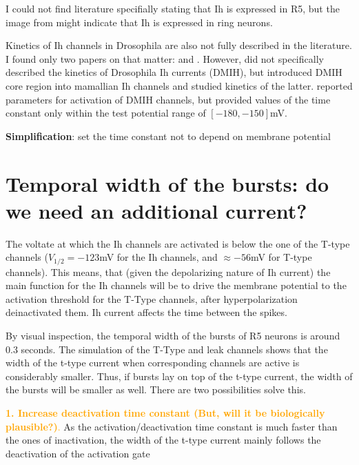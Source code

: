 \documentclass[11pt]{article}
\begin{document}
I could not find literature specifially stating that Ih is expressed in R5,
but the image from \parencite{gonzalo-gomezIhCurrentNecessary2012} might indicate that
Ih is expressed in ring neurons.

Kinetics of Ih channels in Drosophila are also not fully described in the literature. I found
only two papers on that matter: \parencite{gisselmannVariantsDrosophilaMelanogaster2005} and
\parencite{ishiiPeripheralCterminalDomains2007}. However, \parencite{ishiiPeripheralCterminalDomains2007}
did not specifically described the kinetics of Drosophila Ih currents (DMIH), but introduced DMIH
core region into mamallian Ih channels and studied kinetics of the latter. \parencite{gisselmannVariantsDrosophilaMelanogaster2005}
reported parameters for activation of DMIH channels, but provided values of the time constant
only within the test potential range of $[-180, -150]$mV.

\textbf{Simplification}: set the time constant not to depend on membrane potential


\section{Temporal width of the bursts: do we need an additional current?}
    
The voltate at which the Ih channels are activated is below the one of the
T-type channels ($V_{1/2}=-123$mV for the Ih channels, and $\approx-56$mV for T-type
channels). This means, that (given the depolarizing nature of Ih current)
the main function for the Ih channels will be to drive the
membrane potential to the activation threshold for the T-Type channels, after
hyperpolarization deinactivated them. Ih current affects the time between the spikes.

By visual inspection, the temporal width of the bursts of R5 neurons is around
0.3 seconds. The simulation of the T-Type and leak channels shows that the width of the
t-type current when corresponding channels are active is considerably smaller. Thus,
if bursts lay on top of the t-type current, the width of the bursts will be smaller
as well. There are two possibilities solve this.

\textcolor{orange}{
    \textbf{1. Increase deactivation time constant (But, will it be biologically plausible?)}.
}
As the activation/deactivation time constant
is much faster than the ones of inactivation, the width of the t-type current mainly
follows the deactivation of the activation gate
\end{document}
